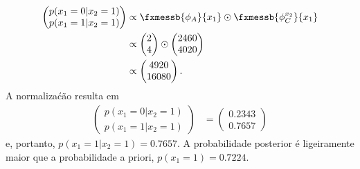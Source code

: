 \begin{exenumerate}
\begin{solution}
        \begin{align}
            \begin{pmatrix}
                p(x_1=0 | x_2=1)\\
                p(x_1=1 | x_2=1)
            \end{pmatrix}
            & \propto 
            \fxmessb{\phi_A}{x_1} \odot \fxmessb{\phi^{x_2}_C}{x_1}\\
            & \propto  
            \begin{pmatrix}
                2 \\
                4 \\
            \end{pmatrix}
            \odot
            \begin{pmatrix}
                2460\\
                4020
            \end{pmatrix}\\
            & \propto
            \begin{pmatrix}
                4920\\
                16080
            \end{pmatrix}.
        \end{align}
        A normaliza\'c\~ao resulta em
        \begin{align}
            \begin{pmatrix}
                p(x_1=0 | x_2=1)\\
                p(x_1=1 | x_2=1)
            \end{pmatrix}
            & =  \begin{pmatrix}
                0.2343\\
                0.7657
            \end{pmatrix}
        \end{align}
        e, portanto, $p(x_1=1 | x_2 =1) = 0.7657$. A probabilidade posterior \'e ligeiramente maior que a probabilidade a priori, $p(x_1=1) = 0.7224$.
    \end{solution}
    
\end{exenumerate}



